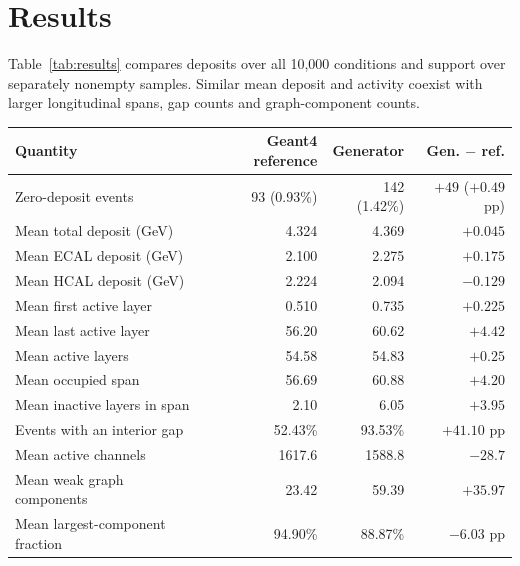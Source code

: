 \documentclass[11pt]{article}
\begin{document}
\section{Results}
\label{sec:results}

Table~\ref{tab:results} compares deposits over all 10,000 conditions and support over separately nonempty samples. Similar mean deposit and activity coexist with larger longitudinal spans, gap counts and graph-component counts.

\begin{center}
\begin{minipage}{\linewidth}
\centering
{}
\label{tab:results}
\small
\begin{tabular}{@{}lrrr@{}}
\toprule
Quantity & Geant4 reference & Generator & Gen. $-$ ref. \\
\midrule
Zero-deposit events & 93 (0.93\%) & 142 (1.42\%) & $+49$ ($+0.49$ pp) \\
Mean total deposit (GeV) & 4.324 & 4.369 & $+0.045$ \\
Mean ECAL deposit (GeV) & 2.100 & 2.275 & $+0.175$ \\
Mean HCAL deposit (GeV) & 2.224 & 2.094 & $-0.129$ \\
\midrule
Mean first active layer & 0.510 & 0.735 & $+0.225$ \\
Mean last active layer & 56.20 & 60.62 & $+4.42$ \\
Mean active layers & 54.58 & 54.83 & $+0.25$ \\
Mean occupied span & 56.69 & 60.88 & $+4.20$ \\
Mean inactive layers in span & 2.10 & 6.05 & $+3.95$ \\
Events with an interior gap & 52.43\% & 93.53\% & $+41.10$ pp \\
Mean active channels & 1617.6 & 1588.8 & $-28.7$ \\
Mean weak graph components & 23.42 & 59.39 & $+35.97$ \\
Mean largest-component fraction & 94.90\% & 88.87\% & $-6.03$ pp \\
\bottomrule
\end{tabular}
\end{minipage}
\end{center}
\end{document}
